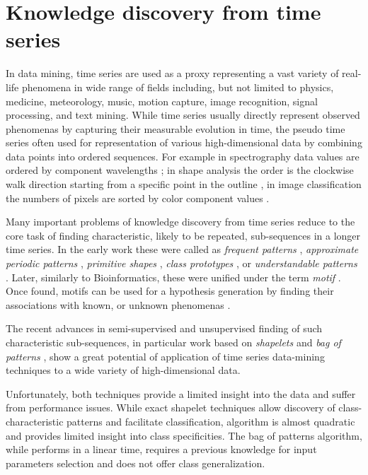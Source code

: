 \section{Knowledge discovery from time series}\label{section_knowledge_discovery}
In data mining, time series are used as a proxy representing a vast variety of real-life phenomena 
in wide range of fields including, but not limited to physics, medicine, meteorology, 
music, motion capture, image recognition, signal processing, and text mining. 
While time series usually directly represent observed phenomenas by capturing their measurable evolution in time, 
the pseudo time series often used for representation of various high-dimensional data 
by combining data points into ordered sequences. 
For example in spectrography data values are ordered by component wavelengths \cite{citeulike:12550833};
in shape analysis the order is the clockwise walk direction starting from a
specific point in the outline \cite{citeulike:12550835}, in image classification the numbers of pixels
are sorted by color component values \cite{citeulike:2900542}.

Many important problems of knowledge discovery from time series reduce to the core task of finding 
characteristic, likely to be repeated, sub-sequences in a longer time series. 
In the early work these were called as 
\textit{frequent patterns} \cite{citeulike:5159615}, 
\textit{approximate periodic patterns} \cite{citeulike:1959582},
\textit{primitive shapes} \cite{citeulike:5898869}, 
\textit{class prototypes} \cite{citeulike:4406444}, 
or \textit{understandable patterns} \cite{citeulike:3978076}. 
Later, similarly to Bioinformatics, these were unified under the term \textit{motif} \cite{citeulike:3977965}.
Once found, motifs can be used for a hypothesis generation by finding their associations with known,
or unknown phenomenas \cite{citeulike:3977965}. 

The recent advances in semi-supervised and unsupervised finding of such characteristic sub-sequences, 
in particular work based on \textit{shapelets} \cite{citeulike:7344347} \cite{citeulike:11957982}
\cite{citeulike:12552293} and \textit{bag of patterns} \cite{citeulike:10525778}, show a great potential 
of application of time series data-mining techniques to a wide variety of high-dimensional data.

Unfortunately, both techniques provide a limited insight into the data and suffer from performance issues. 
While exact shapelet techniques allow discovery of class-characteristic patterns and facilitate classification,
algorithm is almost quadratic and provides limited insight into class specificities. 
The bag of patterns algorithm, while performs in a linear time, requires a previous knowledge for input parameters 
selection and does not offer class generalization.


